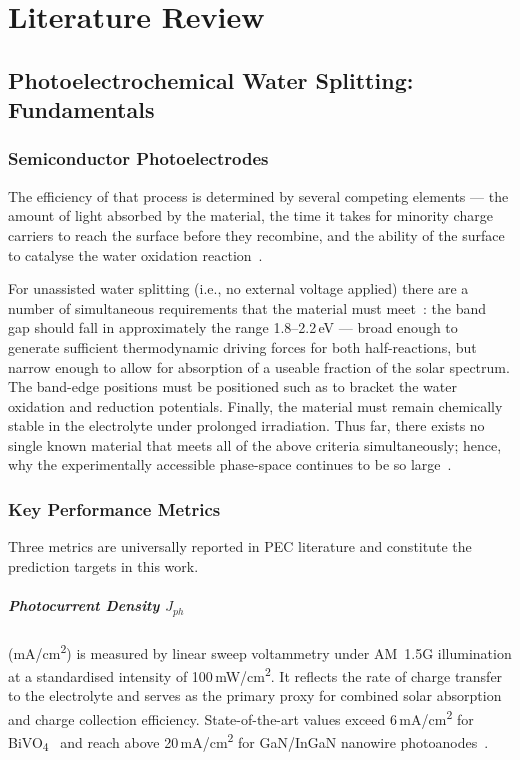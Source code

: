 \chapter{Literature Review}\label{ch:A}

\section{Photoelectrochemical Water Splitting: Fundamentals}

\subsection{Semiconductor Photoelectrodes}

The efficiency of that process is determined by several competing elements ---
the amount of light absorbed by the material, the time it takes for minority
charge carriers to reach the surface before they recombine, and the ability
of the surface to catalyse the water oxidation reaction~\cite{gratzel2001photoelectrochemical}.

For unassisted water splitting (i.e., no external voltage applied) there are
a number of simultaneous requirements that the material must
meet~\cite{bolton1978limiting}: the band gap should fall in approximately the
range 1.8--2.2\,eV --- broad enough to generate sufficient thermodynamic driving
forces for both half-reactions, but narrow enough to allow for absorption of a
useable fraction of the solar spectrum.
The band-edge positions must be positioned such as to bracket the water oxidation
and reduction potentials.
Finally, the material must remain chemically stable in the electrolyte under
prolonged irradiation.
Thus far, there exists no single known material that meets all of the above
criteria simultaneously; hence, why the experimentally accessible phase-space
continues to be so large~\cite{walter2010solar}.

\subsection{Key Performance Metrics}

Three metrics are universally reported in PEC literature and constitute the
prediction targets in this work.

\paragraph{Photocurrent Density $J_{ph}$} (mA/cm\textsuperscript{2}) is measured
by linear sweep voltammetry under AM~1.5G illumination at a standardised intensity
of 100\,mW/cm\textsuperscript{2}.
It reflects the rate of charge transfer to the electrolyte and serves as the
primary proxy for combined solar absorption and charge collection efficiency.
State-of-the-art values exceed 6\,mA/cm\textsuperscript{2} for
BiVO\textsubscript{4}~\cite{kim2014bismuth} and reach above
20\,mA/cm\textsuperscript{2} for GaN/InGaN nanowire photoanodes~\cite{kibria2015multibandgap}.

